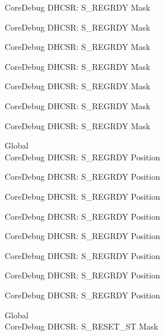 \begin{DoxyRefList}
\label{deprecated__deprecated000120}%
%
Core\+Debug DHCSR\+: S\+\_\+\+REGRDY Mask 

\label{deprecated__deprecated000174}%
%
Core\+Debug DHCSR\+: S\+\_\+\+REGRDY Mask 

\label{deprecated__deprecated000259}%
%
Core\+Debug DHCSR\+: S\+\_\+\+REGRDY Mask 

\label{deprecated__deprecated000316}%
%
Core\+Debug DHCSR\+: S\+\_\+\+REGRDY Mask 

\label{deprecated__deprecated000392}%
%
Core\+Debug DHCSR\+: S\+\_\+\+REGRDY Mask 

\label{deprecated__deprecated000479}%
%
Core\+Debug DHCSR\+: S\+\_\+\+REGRDY Mask 

\label{deprecated__deprecated000581}%
%
Core\+Debug DHCSR\+: S\+\_\+\+REGRDY Mask  
\item[Global \doxylink{group___c_m_s_i_s___core_debug_ga20a71871ca8768019c51168c70c3f41d}{Core\+Debug\+\_\+\+DHCSR\+\_\+\+S\+\_\+\+REGRDY\+\_\+\+Pos} ]\hfill \\
\label{deprecated__deprecated000027}%
%
Core\+Debug DHCSR\+: S\+\_\+\+REGRDY Position 

\label{deprecated__deprecated000119}%
%
Core\+Debug DHCSR\+: S\+\_\+\+REGRDY Position 

\label{deprecated__deprecated000173}%
%
Core\+Debug DHCSR\+: S\+\_\+\+REGRDY Position 

\label{deprecated__deprecated000258}%
%
Core\+Debug DHCSR\+: S\+\_\+\+REGRDY Position 

\label{deprecated__deprecated000315}%
%
Core\+Debug DHCSR\+: S\+\_\+\+REGRDY Position 

\label{deprecated__deprecated000391}%
%
Core\+Debug DHCSR\+: S\+\_\+\+REGRDY Position 

\label{deprecated__deprecated000478}%
%
Core\+Debug DHCSR\+: S\+\_\+\+REGRDY Position 

\label{deprecated__deprecated000580}%
%
Core\+Debug DHCSR\+: S\+\_\+\+REGRDY Position  
\item[Global \doxylink{group___c_m_s_i_s___core_debug_gac474394bcceb31a8e09566c90b3f8922}{Core\+Debug\+\_\+\+DHCSR\+\_\+\+S\+\_\+\+RESET\+\_\+\+ST\+\_\+\+Msk} ]\hfill \\
\label{deprecated__deprecated000010}%
%
Core\+Debug DHCSR\+: S\+\_\+\+RESET\+\_\+\+ST Mask 


\end{DoxyRefList}
